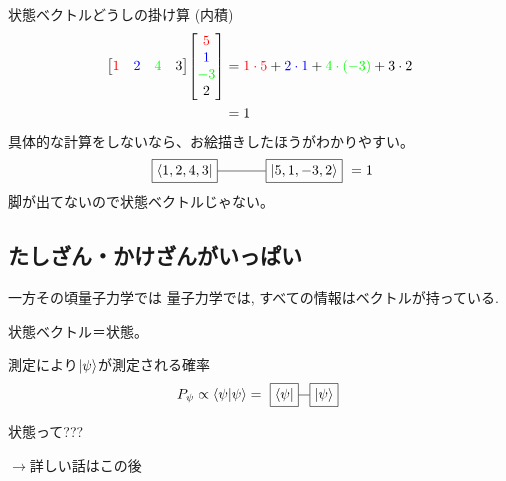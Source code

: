 \documentclass[dvipdfm]{beamer}
\begin{document}
\begin{frame}{状態ベクトルどうしの掛け算 (内積)}
    \begin{equation*}
        \begin{split}
            \mqty[\red{1} & \blue{2} & \green{4} & 3]
            \mqty[\red{5} \\ \blue{1} \\ \green{-3}\\ 2]
            &=
            \red{1\cdot5}
            +
            \blue{2\cdot1}
            +
            \green{4\cdot(-3)}
            +
            3\cdot2
            \\
            &=
            1
        \end{split}
    \end{equation*}
    具体的な計算をしないなら、お絵描きしたほうがわかりやすい。
    \begin{equation*}
        \vcenter{\hbox{
            \begin{tikzpicture}
                \node at(0,0)[draw,rectangle](ket){$\ket{5,1,-3,2}$};
                \node at(-3,0)[draw,rectangle](bra){$\bra{1,2,4,3}$};
                \draw(bra.east)--(ket.west);
            \end{tikzpicture}
        }}
        =
        1
    \end{equation*}
    脚が出てないので状態ベクトルじゃない。
\end{frame}


\subsection{たしざん・かけざんがいっぱい}

\begin{frame}{一方その頃量子力学では}
    量子力学では, すべての情報はベクトルが持っている.

    状態ベクトル＝状態。
    \begin{prop*}{測定により$\ket{\psi}$が測定される確率}{}
        \begin{equation*}
            P_\psi
            \propto
            \braket{\psi}
            =
            \vcenter{\hbox{
                \begin{tikzpicture}
                    \node at(0,0)[draw,rectangle](ket){$\ket{\psi}$};
                    \node at(-1,0)[draw,rectangle](bra){$\bra{\psi}$};
                    \draw(bra.east)--(ket.west);
                \end{tikzpicture}
            }}
        \end{equation*}
    \end{prop*}

    状態って???

    $\rightarrow$詳しい話はこの後
\end{frame}
\end{document}
